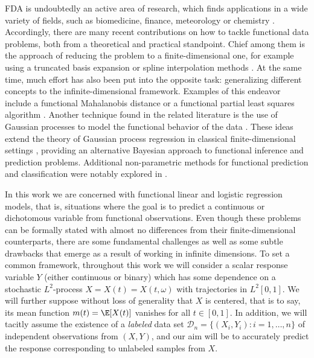 FDA is undoubtedly an active area of research, which finds applications in a wide variety of fields, such as biomedicine, finance, meteorology or chemistry \citep[see for example][]{ullah2013applications}. Accordingly, there are many recent contributions on how to tackle functional data problems, both from a theoretical and practical standpoint. Chief among them is the approach of reducing the problem to a finite-dimensional one, for example using a truncated basis expansion or spline interpolation methods \citep[e.g.][]{muller2005generalized, aguilera2013comparative}. At the same time, much effort has also been put into the opposite task: generalizing different concepts to the infinite-dimensional framework. Examples of this endeavor include a functional Mahalanobis distance \citep{berrendero2020mahalanobis} or a functional partial least squares algorithm \citep{delaigle2012methodology}. Another technique found in the related literature is the use of Gaussian processes to model the functional behavior of the data \citep[see for instance][]{shi2011gaussian}. These ideas extend the theory of Gaussian process regression in classical finite-dimensional settings \citep{rasmussen2004gaussian}, providing an alternative Bayesian approach to functional inference and prediction problems. Additional non-parametric methods for functional prediction and classification were notably explored in \citet{ferraty2006nonparametric}.

In this work we are concerned with functional linear and logistic regression models, that is, situations where the goal is to predict a continuous or dichotomous variable from functional observations. Even though these problems can be formally stated with almost no differences from their finite-dimensional counterparts, there are some fundamental challenges as well as some subtle drawbacks that emerge as a result of working in infinite dimensions. To set a common framework, throughout this work we will consider a scalar response variable \(Y\) (either continuous or binary) which has some dependence on a stochastic \(L^2\)-process \(X=X(t)=X(t, \omega)\) with trajectories in \(L^2[0, 1]\). We will further suppose without loss of generality that \(X\) is centered, that is to say, its mean function \(m(t)=\E[X(t)]\) vanishes for all \(t\in[0,1]\). In addition, we will tacitly assume the existence of a \textit{labeled} data set \(\mathcal D_n =\{(X_i, Y_i): i=1,\dots, n\}\) of independent observations from \((X, Y)\), and our aim will be to accurately predict the response corresponding to unlabeled samples from \(X\).

